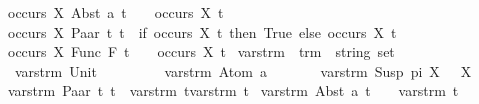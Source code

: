\begin{isabellebody}
{\isacharbar}{\kern0pt}\ {\isachardoublequoteopen}occurs\ X\ {\isacharparenleft}{\kern0pt}Abst\ a\ t{\isacharparenright}{\kern0pt}\ \ \ {\isacharequal}{\kern0pt}\ occurs\ X\ t{\isachardoublequoteclose}\isanewline
{\isacharbar}{\kern0pt}\ {\isachardoublequoteopen}occurs\ X\ {\isacharparenleft}{\kern0pt}Paar\ t{}\ t{}{\isacharparenright}{\kern0pt}\ {\isacharequal}{\kern0pt}\ {\isacharparenleft}{\kern0pt}if\ {\isacharparenleft}{\kern0pt}occurs\ X\ t{}{\isacharparenright}{\kern0pt}\ then\ True\ else\ {\isacharparenleft}{\kern0pt}occurs\ X\ t{}{\isacharparenright}{\kern0pt}{\isacharparenright}{\kern0pt}{\isachardoublequoteclose}\isanewline
{\isacharbar}{\kern0pt}\ {\isachardoublequoteopen}occurs\ X\ {\isacharparenleft}{\kern0pt}Func\ F\ t{\isacharparenright}{\kern0pt}\ \ \ {\isacharequal}{\kern0pt}\ occurs\ X\ t{\isachardoublequoteclose}\isanewline
\isanewline
{}\isamarkupfalse%
\ vars{\isacharunderscore}{\kern0pt}trm\ {\isacharcolon}{\kern0pt}{\isacharcolon}{\kern0pt}\ {\isachardoublequoteopen}trm\ {\isasymRightarrow}\ string\ set{\isachardoublequoteclose}\isanewline
\ \ \isanewline
\ \ {\isachardoublequoteopen}vars{\isacharunderscore}{\kern0pt}trm\ {\isacharparenleft}{\kern0pt}Unit{\isacharparenright}{\kern0pt}\ \ \ \ \ \ \ {\isacharequal}{\kern0pt}\ {\isacharbraceleft}{\kern0pt}{\isacharbraceright}{\kern0pt}{\isachardoublequoteclose}\isanewline
{\isacharbar}{\kern0pt}\ {\isachardoublequoteopen}vars{\isacharunderscore}{\kern0pt}trm\ {\isacharparenleft}{\kern0pt}Atom\ a{\isacharparenright}{\kern0pt}\ \ \ \ \ {\isacharequal}{\kern0pt}\ {\isacharbraceleft}{\kern0pt}{\isacharbraceright}{\kern0pt}{\isachardoublequoteclose}\isanewline
{\isacharbar}{\kern0pt}\ {\isachardoublequoteopen}vars{\isacharunderscore}{\kern0pt}trm\ {\isacharparenleft}{\kern0pt}Susp\ pi\ X{\isacharparenright}{\kern0pt}\ \ {\isacharequal}{\kern0pt}\ {\isacharbraceleft}{\kern0pt}X{\isacharbraceright}{\kern0pt}{\isachardoublequoteclose}\isanewline
{\isacharbar}{\kern0pt}\ {\isachardoublequoteopen}vars{\isacharunderscore}{\kern0pt}trm\ {\isacharparenleft}{\kern0pt}Paar\ t{}\ t{}{\isacharparenright}{\kern0pt}\ {\isacharequal}{\kern0pt}\ {\isacharparenleft}{\kern0pt}vars{\isacharunderscore}{\kern0pt}trm\ t{}{\isacharparenright}{\kern0pt}{\isasymunion}{\isacharparenleft}{\kern0pt}vars{\isacharunderscore}{\kern0pt}trm\ t{}{\isacharparenright}{\kern0pt}{\isachardoublequoteclose}\isanewline
{\isacharbar}{\kern0pt}\ {\isachardoublequoteopen}vars{\isacharunderscore}{\kern0pt}trm\ {\isacharparenleft}{\kern0pt}Abst\ a\ t{\isacharparenright}{\kern0pt}\ \ \ {\isacharequal}{\kern0pt}\ vars{\isacharunderscore}{\kern0pt}trm\ t{\isachardoublequoteclose}\isanewline

\end{isabellebody}
